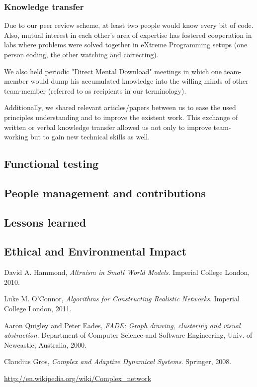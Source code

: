 \documentclass[a4paper,11pt,titlepage]{article}
\begin{document}
\subsubsection{Knowledge transfer}
Due to our peer review scheme, at least two people would know every
bit of code. Also, mutual interest in each other's area of expertise
has fostered cooperation in labs where problems were solved together
in eXtreme Programming setups (one person coding, the other watching
and correcting).

We also held periodic "Direct Mental Download" meetings in which one
team-member would dump his accumulated knowledge into the willing
minds of other team-member (referred to as recipients in our terminology).

Additionally, we shared relevant articles/papers between us to ease
the used principles understanding and to improve the existent work.
This exchange of written or verbal knowledge transfer allowed us not
only to improve team-working but to gain new technical skills as well.



\subsection{Functional testing}
\label{tests}




\subsection{People management and contributions}

\subsection{Lessons learned}


\subsection{Ethical and Environmental Impact}

\begin{thebibliography}{9}

  David A. Hammond,
  \emph{Altruism in Small World Models}.
  Imperial College London,
  2010.

  Luke M. O'Connor,
  \emph{Algorithms for Constructing Realistic Networks}.
  Imperial College London,
  2011.

  Aaron Quigley and Peter Eades,
  \emph{FADE: Graph drawing, clustering and visual abstraction}.
  Department of Computer Science and Software Engineering,
  Univ. of  Newcastle, Australia, 2000.

Claudius Gros,
\emph{Complex and Adaptive Dynamical Systems}.
Springer,
2008.

  \url{http://en.wikipedia.org/wiki/Complex_network}

\end{thebibliography}
\end{document}
